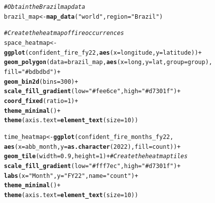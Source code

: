 \documentclass{article}\usepackage[]{graphicx}\usepackage[]{xcolor}
\makeatletter
\newcommand{\hlnum}[1]{\textcolor[rgb]{0.686,0.059,0.569}{#1}}%
\newcommand{\hlstr}[1]{\textcolor[rgb]{0.192,0.494,0.8}{#1}}%
\newcommand{\hlcom}[1]{\textcolor[rgb]{0.678,0.584,0.686}{\textit{#1}}}%
\newcommand{\hlopt}[1]{\textcolor[rgb]{0,0,0}{#1}}%
\newcommand{\hlstd}[1]{\textcolor[rgb]{0.345,0.345,0.345}{#1}}%
\newcommand{\hlkwb}[1]{\textcolor[rgb]{0.69,0.353,0.396}{#1}}%
\newcommand{\hlkwc}[1]{\textcolor[rgb]{0.333,0.667,0.333}{#1}}%
\newcommand{\hlkwd}[1]{\textcolor[rgb]{0.737,0.353,0.396}{\textbf{#1}}}%
\newenvironment{kframe}{%
 \def\at@end@of@kframe{}%
 \ifinner\ifhmode%
  \def\at@end@of@kframe{\end{minipage}}%
  \begin{minipage}{\columnwidth}%
 \fi\fi%
 \def\FrameCommand##1{\hskip\@totalleftmargin \hskip-\fboxsep
 \colorbox{shadecolor}{##1}\hskip-\fboxsep
     \hskip-\linewidth \hskip-\@totalleftmargin \hskip\columnwidth}%
 \MakeFramed {\advance\hsize-\width
   \@totalleftmargin\z@ \linewidth\hsize
   \@setminipage}}%
 {\par\unskip\endMakeFramed%
 \at@end@of@kframe}
\newenvironment{knitrout}{}{} %
\makeatother
\begin{document}
\begin{knitrout}
\color{fgcolor}\begin{kframe}
\begin{alltt}
\hlcom{# Obtain the Brazil map data}
\hlstd{brazil_map} \hlkwb{<-} \hlkwd{map_data}\hlstd{(}\hlstr{"world"}\hlstd{,} \hlkwc{region} \hlstd{=} \hlstr{"Brazil"}\hlstd{)}

\hlcom{# Create the heatmap of fire occurrences}
\hlstd{space_heatmap} \hlkwb{<-} \hlkwd{ggplot}\hlstd{(confident_fire_fy22,} \hlkwd{aes}\hlstd{(}\hlkwc{x} \hlstd{= longitude,} \hlkwc{y} \hlstd{= latitude))} \hlopt{+}
  \hlkwd{geom_polygon}\hlstd{(}\hlkwc{data} \hlstd{= brazil_map,} \hlkwd{aes}\hlstd{(}\hlkwc{x} \hlstd{= long,} \hlkwc{y} \hlstd{= lat,} \hlkwc{group} \hlstd{= group),}
               \hlkwc{fill} \hlstd{=} \hlstr{"#bdbdbd"}\hlstd{)} \hlopt{+}
  \hlkwd{geom_bin2d}\hlstd{(}\hlkwc{bins} \hlstd{=} \hlnum{300}\hlstd{)} \hlopt{+}
  \hlkwd{scale_fill_gradient}\hlstd{(}\hlkwc{low} \hlstd{=} \hlstr{"#fee6ce"}\hlstd{,} \hlkwc{high} \hlstd{=} \hlstr{"#d7301f"}\hlstd{)} \hlopt{+}
  \hlkwd{coord_fixed}\hlstd{(}\hlkwc{ratio} \hlstd{=} \hlnum{1}\hlstd{)} \hlopt{+}
  \hlkwd{theme_minimal}\hlstd{()}\hlopt{+}
  \hlkwd{theme}\hlstd{(}\hlkwc{axis.text} \hlstd{=} \hlkwd{element_text}\hlstd{(}\hlkwc{size} \hlstd{=} \hlnum{10}\hlstd{))}
\end{alltt}


{\ttfamily\noindent\bfseries\color{errorcolor}{\#\# Error in ggplot(confident\_fire\_fy22, aes(x = longitude, y = latitude)): object 'confident\_fire\_fy22' not found}}\begin{alltt}
\hlstd{time_heatmap} \hlkwb{<-} \hlkwd{ggplot}\hlstd{(confident_fire_months_fy22,}
                       \hlkwd{aes}\hlstd{(}\hlkwc{x} \hlstd{= abb_month,} \hlkwc{y} \hlstd{=} \hlkwd{as.character}\hlstd{(}\hlnum{2022}\hlstd{),} \hlkwc{fill} \hlstd{= count))} \hlopt{+}
  \hlkwd{geom_tile}\hlstd{(}\hlkwc{width} \hlstd{=} \hlnum{0.9}\hlstd{,} \hlkwc{height} \hlstd{=} \hlnum{1}\hlstd{)} \hlopt{+}  \hlcom{# Create the heatmap tiles}
  \hlkwd{scale_fill_gradient}\hlstd{(}\hlkwc{low} \hlstd{=} \hlstr{"#fff7ec"}\hlstd{,} \hlkwc{high} \hlstd{=} \hlstr{"#d7301f"}\hlstd{)} \hlopt{+}
  \hlkwd{labs}\hlstd{(}\hlkwc{x} \hlstd{=} \hlstr{"Month"}\hlstd{,} \hlkwc{y} \hlstd{=} \hlstr{"FY22"}\hlstd{,} \hlkwc{name} \hlstd{=} \hlstr{"count"}\hlstd{)} \hlopt{+}
  \hlkwd{theme_minimal}\hlstd{()} \hlopt{+}
  \hlkwd{theme}\hlstd{(}\hlkwc{axis.text} \hlstd{=} \hlkwd{element_text}\hlstd{(}\hlkwc{size} \hlstd{=} \hlnum{10}\hlstd{))}
\end{alltt}



\end{kframe}
\end{knitrout}
\end{document}
